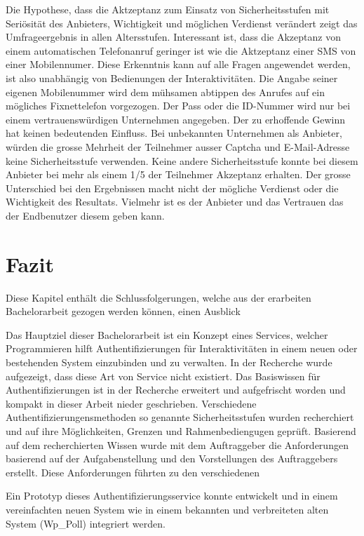 Die Hypothese, dass die Aktzeptanz zum Einsatz von Sicherheitsstufen mit
Seriösität des Anbieters, Wichtigkeit und möglichen Verdienst verändert
zeigt das Umfrageergebnis in allen Altersstufen. Interessant ist, dass
die Akzeptanz von einem automatischen Telefonanruf geringer ist wie die
Aktzeptanz einer SMS von einer Mobilennumer. Diese Erkenntnis kann auf
alle Fragen angewendet werden, ist also unabhängig von Bedienungen der
Interaktivitäten. Die Angabe seiner eigenen Mobilenummer wird dem
mühsamen abtippen des Anrufes auf ein mögliches Fixnettelefon
vorgezogen. Der Pass oder die ID-Nummer wird nur bei einem
vertrauenswürdigen Unternehmen angegeben. Der zu erhoffende Gewinn hat
keinen bedeutenden Einfluss. Bei unbekannten Unternehmen als Anbieter,
würden die grosse Mehrheit der Teilnehmer ausser Captcha und
E-Mail-Adresse keine Sicherheitsstufe verwenden. Keine andere
Sicherheitsstufe konnte bei diesem Anbieter bei mehr als einem 1/5 der
Teilnehmer Akzeptanz erhalten. Der grosse Unterschied bei den
Ergebnissen macht nicht der mögliche Verdienst oder die Wichtigkeit des
Resultats. Vielmehr ist es der Anbieter und das Vertrauen das der
Endbenutzer diesem geben kann.

\chapter{Fazit}\label{fazit-2}

Diese Kapitel enthält die Schlussfolgerungen, welche aus der erarbeiten
Bachelorarbeit gezogen werden können, einen Ausblick

Das Hauptziel dieser Bachelorarbeit ist ein Konzept eines Services,
welcher Programmieren hilft Authentifizierungen für Interaktivitäten in
einem neuen oder bestehenden System einzubinden und zu verwalten. In der
Recherche wurde aufgezeigt, dass diese Art von Service nicht existiert.
Das Basiswissen für Authentifizierungen ist in der Recherche erweitert
und aufgefrischt worden und kompakt in dieser Arbeit nieder geschrieben.
Verschiedene Authentifizierungensmethoden so genannte Sicherheitsstufen
wurden recherchiert und auf ihre Möglichkeiten, Grenzen und
Rahmenbediengugen geprüft. Basierend auf dem recherchierten Wissen wurde
mit dem Auftraggeber die Anforderungen basierend auf der
Aufgabenstellung und den Vorstellungen des Auftraggebers erstellt. Diese
Anforderungen führten zu den verschiedenen

Ein Prototyp dieses Authentifizierungsservice konnte entwickelt und in
einem vereinfachten neuen System wie in einem bekannten und verbreiteten
alten System (Wp\_Poll) integriert werden.

